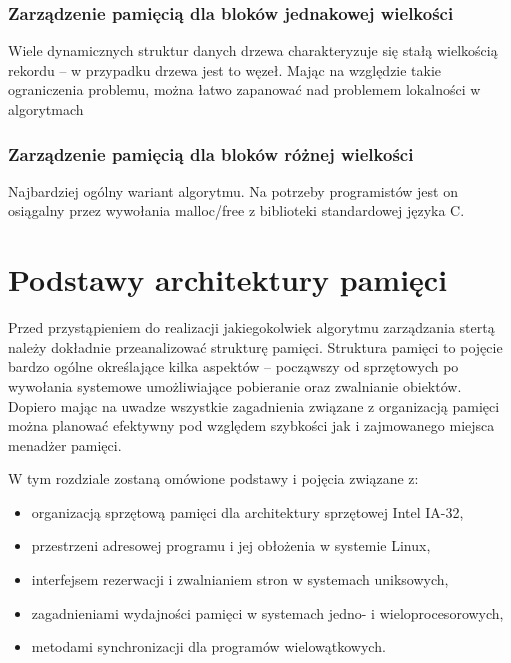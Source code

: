 \documentclass[12pt,a4paper,titlepage,twoside]{mwart}
\begin{document}
\subsubsection{Zarządzenie pamięcią dla bloków jednakowej wielkości}

Wiele dynamicznych struktur danych drzewa charakteryzuje się stałą wielkością
rekordu -- w przypadku drzewa jest to węzeł. Mając na względzie takie
ograniczenia problemu, można łatwo zapanować nad problemem lokalności w algorytmach

\subsubsection{Zarządzenie pamięcią dla bloków różnej wielkości}

Najbardziej ogólny wariant algorytmu. Na potrzeby programistów jest on
osiągalny przez wywołania malloc/free z biblioteki standardowej języka C.

\newpage


\section{Podstawy architektury pamięci}

Przed przystąpieniem do realizacji jakiegokolwiek algorytmu zarządzania stertą
należy dokładnie przeanalizować strukturę pamięci. Struktura pamięci to pojęcie
bardzo ogólne określające kilka aspektów -- począwszy od sprzętowych po
wywołania systemowe umożliwiające pobieranie oraz zwalnianie obiektów. Dopiero
mając na uwadze wszystkie zagadnienia związane z organizacją pamięci można
planować efektywny pod względem szybkości jak i zajmowanego miejsca menadżer
pamięci.

W tym rozdziale zostaną omówione podstawy i pojęcia związane z:
\begin{itemize}
\item organizacją sprzętową pamięci dla architektury sprzętowej Intel IA-32,
\item przestrzeni adresowej programu i jej obłożenia w systemie Linux,
\item interfejsem rezerwacji i zwalnianiem stron w systemach uniksowych,
\item zagadnieniami wydajności pamięci w systemach jedno- i wieloprocesorowych,
\item metodami synchronizacji dla programów wielowątkowych.
\end{itemize}
\end{document}
